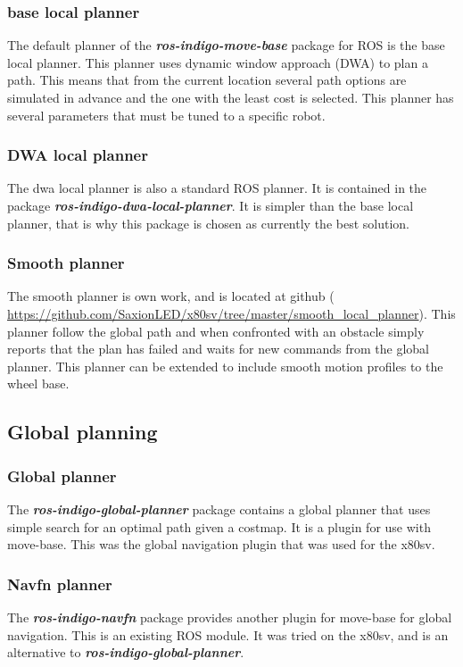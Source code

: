 \documentclass[a4paper]{article}
\newcommand{\rospackage}[1]{\textbf{\textit{ros-indigo-#1}}}
\begin{document}
\subsubsection{base local planner}
The default planner of the \rospackage{move-base} package for ROS is the base local planner.
This planner uses dynamic window approach (DWA) to plan a path. This means that from the current 
location several path options are simulated in advance and the one with the least cost is selected.
This planner has several parameters that must be tuned to a specific robot.

\subsubsection{DWA local planner}
The dwa local planner is also a standard ROS planner. It is contained in the package
\rospackage{dwa-local-planner}.
It is simpler than the base local planner,
that is why this package is chosen as currently the best solution.

\subsubsection{Smooth planner}
The smooth planner is own work, and is located at github (
\url{https://github.com/SaxionLED/x80sv/tree/master/smooth_local_planner}).
This planner follow the global path and when confronted with an obstacle simply
reports that the plan has failed and waits for new commands from the global planner.
This planner can be extended to include smooth motion profiles to the wheel base.

\subsection{Global planning}

\subsubsection{Global planner}
The \rospackage{global-planner} package contains a global planner that uses simple search
for an optimal path given a costmap. It is a plugin for use with move-base.
This was the global navigation plugin that was used for the x80sv.

\subsubsection{Navfn planner}
The \rospackage{navfn} package provides another plugin for move-base for global navigation.
This is an existing ROS module. It was tried on the x80sv, and is an alternative to \rospackage{global-planner}.
\end{document}
